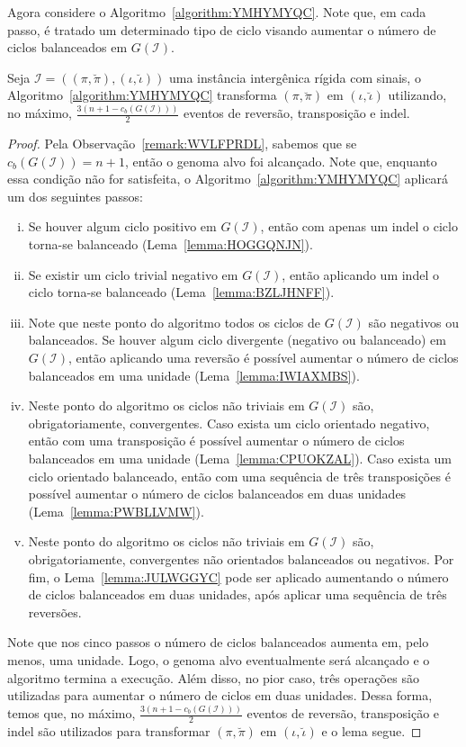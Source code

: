 Agora considere o Algoritmo~\ref{algorithm:YMHYMYQC}. Note que, em cada passo, é tratado um determinado tipo de ciclo visando aumentar o número de ciclos balanceados em $G(\mathcal{I})$.



\begin{lemma}\label{lemma:TKRHFREQ}
Seja $\mathcal{I} = ((\pi,\breve\pi),(\iota,\breve\iota))$ uma instância intergênica rígida com sinais, o Algoritmo~\ref{algorithm:YMHYMYQC} transforma $(\pi,\breve\pi)$ em $(\iota,\breve\iota)$ utilizando, no máximo, $\frac{3(n+1 - c_b(G(\mathcal{I})))}{2}$ eventos de reversão, transposição e indel.
\end{lemma}
\begin{proof}
Pela Observação~\ref{remark:WVLFPRDL}, sabemos que se $c_b(G(\mathcal{I})) = {n + 1}$, então o genoma alvo foi alcançado. Note que, enquanto essa condição não for satisfeita, o Algoritmo~\ref{algorithm:YMHYMYQC} aplicará um dos seguintes passos: 

\begin{enumerate}[i.]
  \item Se houver algum ciclo positivo em $G(\mathcal{I})$, então com apenas um indel o ciclo torna-se balanceado (Lema~\ref{lemma:HOGGQNJN}).
  \item Se existir um ciclo trivial negativo em $G(\mathcal{I})$, então aplicando um indel o ciclo torna-se balanceado (Lema~\ref{lemma:BZLJHNFF}).
  \item Note que neste ponto do algoritmo todos os ciclos de $G(\mathcal{I})$ são negativos ou balanceados. Se houver algum ciclo divergente (negativo ou balanceado) em $G(\mathcal{I})$, então aplicando uma reversão é possível aumentar o número de ciclos balanceados em uma unidade (Lema~\ref{lemma:IWIAXMBS}).
  \item Neste ponto do algoritmo os ciclos não triviais em $G(\mathcal{I})$ são, obrigatoriamente, convergentes. Caso exista um ciclo orientado negativo, então com uma transposição é possível aumentar o número de ciclos balanceados em uma unidade (Lema~\ref{lemma:CPUOKZAL}). Caso exista um ciclo orientado balanceado, então com uma sequência de três transposições é possível aumentar o número de ciclos balanceados em duas unidades (Lema~\ref{lemma:PWBLLVMW}).
  \item Neste ponto do algoritmo os ciclos não triviais em $G(\mathcal{I})$ são, obrigatoriamente, convergentes não orientados balanceados ou negativos. Por fim, o Lema~\ref{lemma:JULWGGYC} pode ser aplicado aumentando o número de ciclos balanceados em duas unidades, após aplicar uma sequência de três reversões.
\end{enumerate}

Note que nos cinco passos o número de ciclos balanceados aumenta em, pelo menos, uma unidade. Logo, o genoma alvo eventualmente será alcançado e o algoritmo termina a execução. Além disso, no pior caso, três operações são utilizadas para aumentar o número de ciclos em duas unidades. Dessa forma, temos que, no máximo, $\frac{3(n+1 - c_b(G(\mathcal{I})))}{2}$ eventos de reversão, transposição e indel são utilizados para transformar $(\pi,\breve\pi)$ em $(\iota,\breve\iota)$ e o lema segue.
\end{proof}

